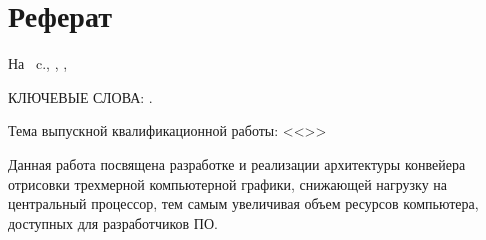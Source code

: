 \chapter*[Count-me]{Реферат} %
\thispagestyle{empty}%

%
%



На ~c.,  
,
,

{\MakeUppercase{Ключевые слова: \keywordsRu}.}%

Тема выпускной квалификационной работы: <<\thesisTitle>>%


Данная работа посвящена разработке и реализации архитектуры конвейера отрисовки трехмерной компьютерной графики, снижающей нагрузку на центральный процессор, тем самым увеличивая объем ресурсов компьютера, доступных для разработчиков ПО.

